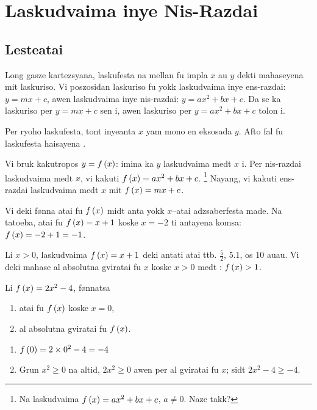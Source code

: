 \chapter{Laskudvaima inye Nis-Razdai}

\section{Lesteatai}

Long gasze kartezsyana, laskufesta na mellan fu impla \(x\) au \(y\) dekti mahaseyena mit laskuriso.
Vi poszosidan laskuriso fu yokk laskudvaima inye ens-razdai: \(y = mx + c\), awen laskudvaima inye
nis-razdai: \(y = ax^2 + bx + c\). Da se ka laskuriso per \(y = mx + c\) sen i, awen laskuriso per
\(y = ax^2 + bx + c\) tolon i.

Per ryoho laskufesta, tont inyeanta \(x\) yam mono en eksosada \(y\).
Afto fal fu laskufesta haisayena .

Vi bruk kakutropos \(y = f\left(x\right)\): imina ka \(y\) laskudvaima medt \(x\) i.
Per nis-razdai laskudvaima medt \(x\), vi kakuti
\(f \left(x\right) = ax^2 + bx + c\). \footnote{Na  laskudvaima
\(f \left(x\right) = ax^2 + bx + c\), \(a \neq 0\). Naze takk?}
Nayang, vi kakuti ens-razdai laskudvaima medt \(x\) mit \(f \left(x\right) = mx + c\).

Vi deki fønna atai fu \(f \left(x\right)\) midt anta yokk \(x\)--atai adzsaberfesta made.
Na tatoeba, atai fu \(f \left(x\right) = x + 1\) koske \(x = -2\) ti antayena komsa: \(f \left(x\right) = -2 + 1 = -1\).

Li \(x > 0\), laskudvaima \(f \left(x\right) = x + 1\) deki antati atai ttb. \(\frac{5}{2}\), \(5.1\), os \(10\) auau.
Vi deki mahase al absolutna gviratai fu \(x\) koske \(x > 0\) medt : \(f \left(x\right) > 1\).

\begin{tatoeba}
  Li \(f \left(x\right) = 2x^2 - 4\), fønnatsa
  \begin{enumerate}
    \item atai fu \(f \left(x\right)\) koske \(x = 0\),
    \item al absolutna gviratai fu \(f \left(x\right)\).
  \end{enumerate}
\end{tatoeba}
\begin{svarna}
  \begin{enumerate}
    \item \(f \left(0\right) = 2 \times 0^2 - 4 = -4\)
    \item Grun \(x^2 \geq 0\) na altid, \(2x^2 \geq 0\) awen per al gviratai fu \(x\); sidt \(2x^2 - 4 \geq - 4\).
  \end{enumerate}
\end{svarna}

